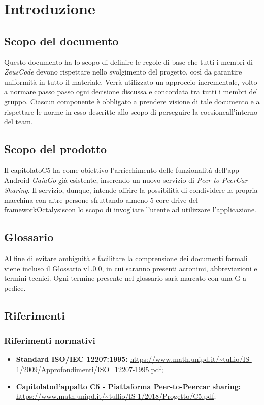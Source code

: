 \section {Introduzione}
\subsection {Scopo del documento}
Questo documento  ha lo scopo di definire le regole di base che tutti i membri di \textit{ZeusCode} devono rispettare nello svolgimento del progetto, così da garantire uniformità in tutto il materiale. Verrà utilizzato un approccio incrementale\glo, volto a normare passo passo ogni decisione discussa e concordata tra tutti i membri del gruppo. Ciascun componente è obbligato a prendere visione di tale documento e a rispettare le norme in esso descritte allo scopo di perseguire la coesione\glosp all'interno del team.
\subsection {Scopo del prodotto}
Il capitolato\glosp C5 ha come obiettivo l'arricchimento delle funzionalità dell'app Android \textit{GaiaGo} già esistente, inserendo un nuovo servizio di \textit{Peer-to-Peer\glosp Car Sharing}.
Il servizio, dunque, intende offrire la possibilità di condividere la propria macchina con altre persone sfruttando almeno 5 core drive del framework\glosp Octalysis\glosp con lo scopo di invogliare l'utente ad utilizzare l'applicazione.
\subsection {Glossario}
Al fine di evitare ambiguità e facilitare la comprensione dei documenti formali viene incluso il Glossario v1.0.0, in cui saranno presenti acronimi, abbreviazioni e termini tecnici. Ogni termine presente nel glossario sarà marcato con una G a pedice.
\subsection {Riferimenti}
\subsubsection {Riferimenti normativi}

\begin{itemize}
	\item  \textbf{Standard ISO/IEC 12207:1995:}\newline
	\url{https://www.math.unipd.it/~tullio/IS-1/2009/Approfondimenti/ISO_12207-1995.pdf};
	\item \textbf{Capitolato\glosp d'appalto C5 - Piattaforma Peer-to-Peer\glosp car sharing:}\newline 
	\url{https://www.math.unipd.it/~tullio/IS-1/2018/Progetto/C5.pdf};
\end{itemize}

